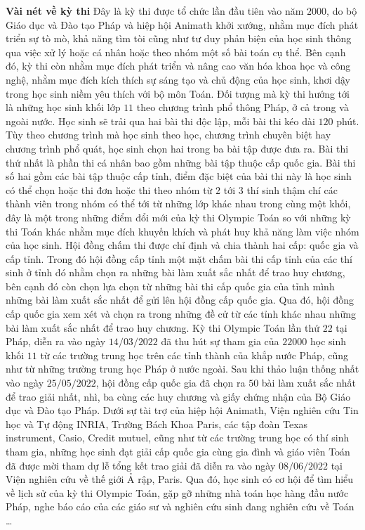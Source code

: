 \begin{multicols}{2}
	\textbf{\color{cackithi}Vài nét về kỳ thi}
	\vskip 0.1cm
	Đây là kỳ thi được tổ chức lần đầu tiên vào năm $2000$, do bộ Giáo dục và Đào tạo Pháp và hiệp hội Animath khởi xướng, nhằm mục đích phát triển sự tò mò, khả năng tìm tòi cũng như tư duy phản biện của học sinh thông qua việc xử lý hoặc cá nhân hoặc theo nhóm một số bài toán cụ thể. Bên cạnh đó, kỳ thi còn nhằm mục đích phát triển và nâng cao văn hóa khoa học và công nghệ, nhằm mục đích kích thích sự sáng tạo và chủ động của học sinh, khơi dậy trong học sinh niềm yêu thích với bộ môn Toán. Đối tượng mà kỳ thi hướng tới là những học sinh khối lớp $11$ theo chương trình phổ thông Pháp, ở cả trong và ngoài nước. 
	\vskip 0.1cm
	Học sinh sẽ trải qua hai bài thi độc lập, mỗi bài thi kéo dài $120$ phút. Tùy theo chương trình mà học sinh theo học, chương trình chuyên biệt hay chương trình phổ quát, học sinh chọn hai trong ba bài tập được đưa ra. Bài thi thứ nhất là phần thi cá nhân bao gồm những bài tập thuộc cấp quốc gia. Bài thi số hai gồm các bài tập thuộc cấp tỉnh, điểm đặc biệt của bài thi này là học sinh có thể chọn hoặc thi đơn hoặc thi theo nhóm từ $2$ tới $3$ thí sinh thậm chí các thành viên trong nhóm có thể tới từ những lớp khác nhau trong cùng một khối, đây là một trong những điểm đổi mới của kỳ thi Olympic Toán so với những kỳ thi Toán khác nhằm mục đích khuyến khích và phát huy khả năng làm việc nhóm của học sinh.
	\vskip 0.1cm 
	Hội đồng chấm thi được chỉ định và chia thành hai cấp: quốc gia và cấp tỉnh. Trong đó hội đồng cấp tỉnh một mặt chấm bài thi cấp tỉnh của các thí sinh ở tỉnh đó nhằm chọn ra những bài làm xuất sắc nhất để trao huy chương, bên cạnh đó còn chọn lựa chọn từ những bài thi cấp quốc gia của tỉnh mình những bài làm xuất sắc nhất để gửi lên hội đồng cấp quốc gia. Qua đó, hội đồng cấp quốc gia xem xét và chọn ra trong những đề cử từ các tỉnh khác nhau những bài làm xuất sắc nhất để trao huy chương. 
	\vskip 0.1cm
	Kỳ thi Olympic Toán lần thứ $22$ tại Pháp, diễn ra vào ngày $14/03/2022$ đã thu hút sự tham gia của $22000$ học sinh khối $11$ từ các trường trung học trên các tỉnh thành của khắp nước Pháp, cũng như từ những trường trung học Pháp ở nước ngoài. Sau khi thảo luận thống nhất vào ngày $25/05/2022$, hội đồng cấp quốc gia đã chọn ra $50$ bài làm xuất sắc nhất để trao giải nhất, nhì, ba cùng các huy chương và giấy chứng nhận của Bộ Giáo dục và Đào tạo Pháp. Dưới sự tài trợ của hiệp hội Animath, Viện nghiên cứu Tin học và Tự động  INRIA, Trường Bách Khoa Paris, các tập đoàn Texas instrument, Casio, Credit mutuel, cũng như từ các trường trung học có thí sinh tham gia, những học sinh đạt giải cấp quốc gia cùng gia đình và giáo viên Toán đã được mời tham dự lễ tổng kết trao giải đã diễn ra vào ngày $08/06/2022$ tại Viện nghiên cứu về thế giới Ả rập, Paris. Qua đó, học sinh có cơ hội để tìm hiểu về lịch sử của kỳ thi Olympic Toán, gặp gỡ những nhà toán học hàng đầu nước Pháp, nghe báo cáo của các giáo sư và nghiên cứu sinh đang nghiên cứu về Toán \ldots 

\end{multicols}
